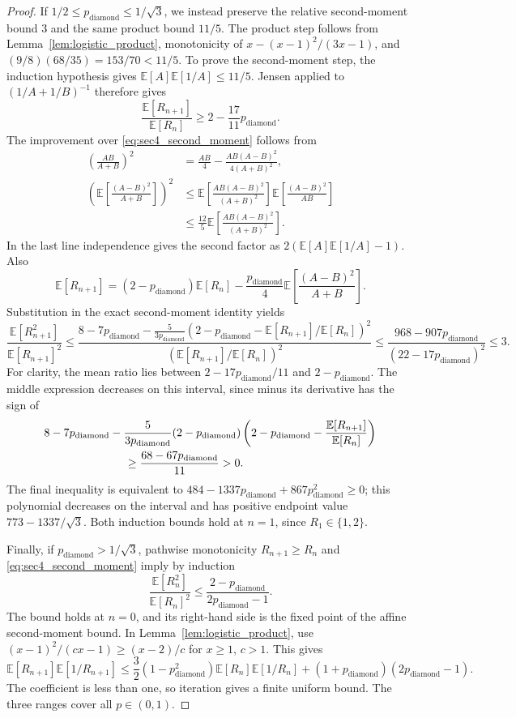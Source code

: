 \documentclass{article}
\theoremstyle{plain}
\theoremstyle{definition}
\begin{document}
\begin{proof}
If $1/2\le p_{\mathrm{diamond}}\le1/\sqrt3$, we instead preserve
the relative second-moment bound $3$ and the same product bound $11/5$.
The product step follows from Lemma~\ref{lem:logistic_product}, monotonicity
of $x-(x-1)^2/(3x-1)$, and
$(9/8)(68/35)=153/70<11/5$.
To prove the second-moment step, the induction hypothesis gives
$\mathbb E[A]\mathbb E[1/A]\le11/5$.
Jensen applied to $(1/A+1/B)^{-1}$ therefore gives
\[
\frac{\mathbb E[R_{n+1}]}{\mathbb E[R_n]}
\ge2-\frac{17}{11}p_{\mathrm{diamond}}.
\]
The improvement over \eqref{eq:sec4_second_moment} follows from
\begin{align*}
\left(\frac{AB}{A+B}\right)^2
&=\frac{AB}{4}-\frac{AB(A-B)^2}{4(A+B)^2},\\
\left(\mathbb E\left[\frac{(A-B)^2}{A+B}\right]\right)^2
&\le\mathbb E\left[\frac{AB(A-B)^2}{(A+B)^2}\right]
       \mathbb E\left[\frac{(A-B)^2}{AB}\right]\\
&\le\frac{12}{5}\mathbb E\left[\frac{AB(A-B)^2}{(A+B)^2}\right].
\end{align*}
In the last line independence gives the second factor as
$2(\mathbb E[A]\mathbb E[1/A]-1)$.
Also
\[
\mathbb E[R_{n+1}]=(2-p_{\mathrm{diamond}})\mathbb E[R_n]
-\frac{p_{\mathrm{diamond}}}{4}
\mathbb E\left[\frac{(A-B)^2}{A+B}\right].
\]
Substitution in the exact second-moment identity yields
\[
\frac{\mathbb E[R_{n+1}^2]}{\mathbb E[R_{n+1}]^2}
\le
\frac{8-7p_{\mathrm{diamond}}
-\frac5{3p_{\mathrm{diamond}}}
 (2-p_{\mathrm{diamond}}-\mathbb E[R_{n+1}]/\mathbb E[R_n])^2}
 {(\mathbb E[R_{n+1}]/\mathbb E[R_n])^2}
\le\frac{968-907p_{\mathrm{diamond}}}{(22-17p_{\mathrm{diamond}})^2}
\le3.
\]
For clarity, the mean ratio lies between
$2-17p_{\mathrm{diamond}}/11$ and $2-p_{\mathrm{diamond}}$.
The middle expression decreases on this interval, since minus its
derivative has the sign of
\begin{align*}
&8-7p_{\mathrm{diamond}}
-\frac5{3p_{\mathrm{diamond}}}(2-p_{\mathrm{diamond}})
 \left(2-p_{\mathrm{diamond}}-\frac{\mathbb E[R_{n+1}]}{\mathbb E[R_n]}\right)\\
&\hspace{25mm}\ge\frac{68-67p_{\mathrm{diamond}}}{11}>0.
\end{align*}
The final inequality is equivalent to
$484-1337p_{\mathrm{diamond}}+867p_{\mathrm{diamond}}^2\ge0$;
this polynomial decreases on the interval and has positive endpoint value
$773-1337/\sqrt3$.
Both induction bounds hold at $n=1$, since $R_1\in\{1,2\}$.

Finally, if $p_{\mathrm{diamond}}>1/\sqrt3$, pathwise monotonicity
$R_{n+1}\ge R_n$ and \eqref{eq:sec4_second_moment} imply by induction
\[
\frac{\mathbb E[R_n^2]}{\mathbb E[R_n]^2}
\le\frac{2-p_{\mathrm{diamond}}}{2p_{\mathrm{diamond}}-1}.
\]
The bound holds at $n=0$, and its right-hand side is the fixed point
of the affine second-moment bound. In Lemma~\ref{lem:logistic_product},
use $(x-1)^2/(c x-1)\ge(x-2)/c$ for $x\ge1$, $c>1$.
This gives
\[
\mathbb E[R_{n+1}]\mathbb E[1/R_{n+1}]
\le\frac32(1-p_{\mathrm{diamond}}^2)
       \mathbb E[R_n]\mathbb E[1/R_n]
 +(1+p_{\mathrm{diamond}})(2p_{\mathrm{diamond}}-1).
\]
The coefficient is less than one, so iteration gives a finite uniform
bound. The three ranges cover all $p\in(0,1)$.
\end{proof}
\end{document}
